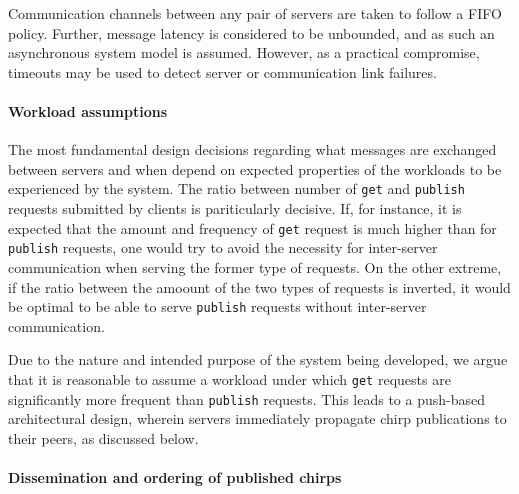 Communication channels between any pair of servers are taken to follow a FIFO policy. Further, message latency is considered to be unbounded, and as such an asynchronous system model is assumed. However, as a practical compromise, timeouts may be used to detect server or communication link failures.


\paragraph{Workload assumptions}


The most fundamental design decisions regarding what messages are exchanged between servers and when depend on expected properties of the workloads to be experienced by the system. The ratio between number of \texttt{get} and \texttt{publish} requests submitted by clients is pariticularly decisive. If, for instance, it is expected that the amount and frequency of \texttt{get} request is much higher than for \texttt{publish} requests, one would try to avoid the necessity for inter-server communication when serving the former type of requests. On the other extreme, if the ratio between the amoount of the two types of requests is inverted, it would be optimal to be able to serve \texttt{publish} requests without inter-server communication.

Due to the nature and intended purpose of the system being developed, we argue that it is reasonable to assume a workload under which \texttt{get} requests are significantly more frequent than \texttt{publish} requests. This leads to a push-based architectural design, wherein servers immediately propagate chirp publications to their peers, as discussed below.


\paragraph{Dissemination and ordering of published chirps}


